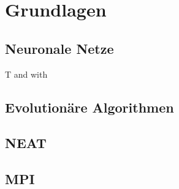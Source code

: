 \chapter{Grundlagen}
\section{Neuronale Netze}
\ac{T} and \cite{stanley2002evolving} with \citeauthor{stanley2002evolving}
\section{Evolutionäre Algorithmen}
\section{NEAT}
\section{MPI}